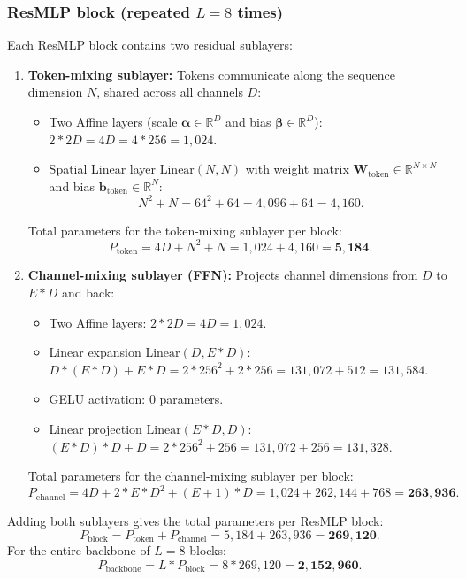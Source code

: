 \subsubsection{ResMLP block (repeated $L=8$ times)}
Each ResMLP block contains two residual sublayers:
\begin{enumerate}[label=(\alph*)]
    \item \textbf{Token-mixing sublayer:} Tokens communicate along the sequence dimension $N$, shared across all channels $D$:
    \begin{itemize}
        \item Two Affine layers (scale $\bm{\alpha} \in \mathbb{R}^D$ and bias $\bm{\beta} \in \mathbb{R}^D$): $2 * 2D = 4D = 4 * 256 = 1,024$.
        \item Spatial Linear layer $\text{Linear}(N, N)$ with weight matrix $\mathbf{W}_{\text{token}} \in \mathbb{R}^{N \times N}$ and bias $\bm{b}_{\text{token}} \in \mathbb{R}^N$:
        \begin{equation}
            N^2 + N = 64^2 + 64 = 4,096 + 64 = 4,160.
        \end{equation}
    \end{itemize}
    Total parameters for the token-mixing sublayer per block:
    \begin{equation}
        P_{\text{token}} = 4D + N^2 + N = 1,024 + 4,160 = \mathbf{5,184}.
    \end{equation}

    \item \textbf{Channel-mixing sublayer (FFN):} Projects channel dimensions from $D$ to $E * D$ and back:
    \begin{itemize}
        \item Two Affine layers: $2 * 2D = 4D = 1,024$.
        \item Linear expansion $\text{Linear}(D, E * D)$: $D * (E * D) + E * D = 2 * 256^2 + 2 * 256 = 131,072 + 512 = 131,584$.
        \item GELU activation: $0$ parameters.
        \item Linear projection $\text{Linear}(E * D, D)$: $(E * D) * D + D = 2 * 256^2 + 256 = 131,072 + 256 = 131,328$.
    \end{itemize}
    Total parameters for the channel-mixing sublayer per block:
    \begin{equation}
        P_{\text{channel}} = 4D + 2 * E * D^2 + (E + 1) * D = 1,024 + 262,144 + 768 = \mathbf{263,936}.
    \end{equation}
\end{enumerate}
Adding both sublayers gives the total parameters per ResMLP block:
\begin{equation}
    P_{\text{block}} = P_{\text{token}} + P_{\text{channel}} = 5,184 + 263,936 = \mathbf{269,120}.
\end{equation}
For the entire backbone of $L=8$ blocks:
\begin{equation}
    P_{\text{backbone}} = L * P_{\text{block}} = 8 * 269,120 = \mathbf{2,152,960}.
\end{equation}

